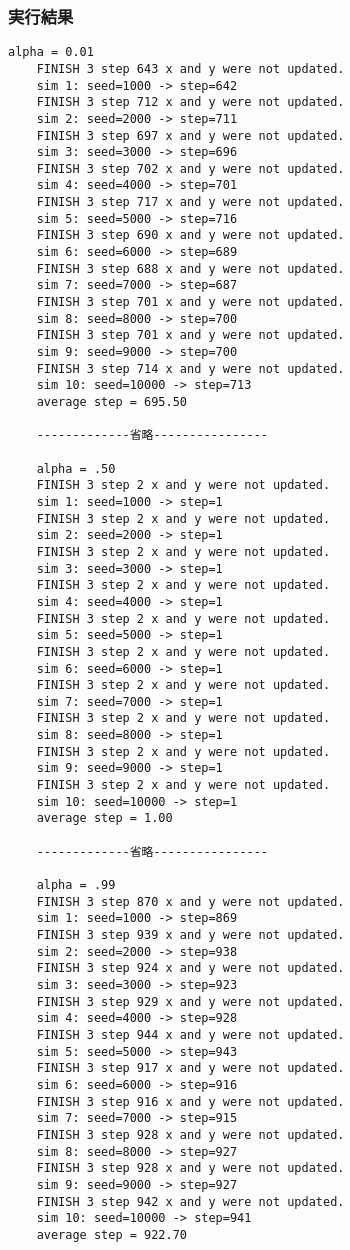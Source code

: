 \subsubsection{実行結果}
	\begin{lstlisting}[caption=シェルスクリプトalpha.sh実行結果,label=ラベル]
	alpha = 0.01
	FINISH 3 step 643 x and y were not updated.
	sim 1: seed=1000 -> step=642
	FINISH 3 step 712 x and y were not updated.
	sim 2: seed=2000 -> step=711
	FINISH 3 step 697 x and y were not updated.
	sim 3: seed=3000 -> step=696
	FINISH 3 step 702 x and y were not updated.
	sim 4: seed=4000 -> step=701
	FINISH 3 step 717 x and y were not updated.
	sim 5: seed=5000 -> step=716
	FINISH 3 step 690 x and y were not updated.
	sim 6: seed=6000 -> step=689
	FINISH 3 step 688 x and y were not updated.
	sim 7: seed=7000 -> step=687
	FINISH 3 step 701 x and y were not updated.
	sim 8: seed=8000 -> step=700
	FINISH 3 step 701 x and y were not updated.
	sim 9: seed=9000 -> step=700
	FINISH 3 step 714 x and y were not updated.
	sim 10: seed=10000 -> step=713
	average step = 695.50

	-------------省略----------------
	
	alpha = .50
	FINISH 3 step 2 x and y were not updated.
	sim 1: seed=1000 -> step=1
	FINISH 3 step 2 x and y were not updated.
	sim 2: seed=2000 -> step=1
	FINISH 3 step 2 x and y were not updated.
	sim 3: seed=3000 -> step=1
	FINISH 3 step 2 x and y were not updated.
	sim 4: seed=4000 -> step=1
	FINISH 3 step 2 x and y were not updated.
	sim 5: seed=5000 -> step=1
	FINISH 3 step 2 x and y were not updated.
	sim 6: seed=6000 -> step=1
	FINISH 3 step 2 x and y were not updated.
	sim 7: seed=7000 -> step=1
	FINISH 3 step 2 x and y were not updated.
	sim 8: seed=8000 -> step=1
	FINISH 3 step 2 x and y were not updated.
	sim 9: seed=9000 -> step=1
	FINISH 3 step 2 x and y were not updated.
	sim 10: seed=10000 -> step=1
	average step = 1.00

	-------------省略----------------
	
	alpha = .99
	FINISH 3 step 870 x and y were not updated.
	sim 1: seed=1000 -> step=869
	FINISH 3 step 939 x and y were not updated.
	sim 2: seed=2000 -> step=938
	FINISH 3 step 924 x and y were not updated.
	sim 3: seed=3000 -> step=923
	FINISH 3 step 929 x and y were not updated.
	sim 4: seed=4000 -> step=928
	FINISH 3 step 944 x and y were not updated.
	sim 5: seed=5000 -> step=943
	FINISH 3 step 917 x and y were not updated.
	sim 6: seed=6000 -> step=916
	FINISH 3 step 916 x and y were not updated.
	sim 7: seed=7000 -> step=915
	FINISH 3 step 928 x and y were not updated.
	sim 8: seed=8000 -> step=927
	FINISH 3 step 928 x and y were not updated.
	sim 9: seed=9000 -> step=927
	FINISH 3 step 942 x and y were not updated.
	sim 10: seed=10000 -> step=941
	average step = 922.70
	\end{lstlisting}

